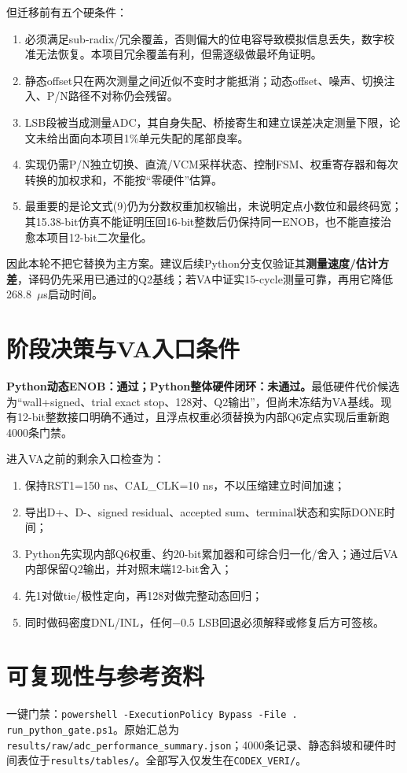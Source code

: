 \documentclass[UTF8,fontset=windows,a4paper,10.5pt]{ctexart}
\begin{document}
但迁移前有五个硬条件：
\begin{enumerate}
\item 必须满足sub-radix/冗余覆盖，否则偏大的位电容导致模拟信息丢失，数字校准无法恢复。本项目冗余覆盖有利，但需逐级做最坏角证明。
\item 静态offset只在两次测量之间近似不变时才能抵消；动态offset、噪声、切换注入、P/N路径不对称仍会残留。
\item LSB段被当成测量ADC，其自身失配、桥接寄生和建立误差决定测量下限，论文未给出面向本项目1\%单元失配的尾部良率。
\item 实现仍需P/N独立切换、直流/VCM采样状态、控制FSM、权重寄存器和每次转换的加权求和，不能按“零硬件”估算。
\item 最重要的是论文式(9)仍为分数权重加权输出，未说明定点小数位和最终码宽；其15.38-bit仿真不能证明压回16-bit整数后仍保持同一ENOB，也不能直接治愈本项目12-bit二次量化。
\end{enumerate}
因此本轮不把它替换为主方案。建议后续Python分支仅验证其\textbf{测量速度/估计方差}，译码仍先采用已通过的Q2基线；若VA中证实15-cycle测量可靠，再用它降低268.8~$\mu$s启动时间。

\section{阶段决策与VA入口条件}
\textbf{Python动态ENOB：通过；Python整体硬件闭环：未通过。}最低硬件代价候选为“wall+signed、trial exact stop、128对、Q2输出”，但尚未冻结为VA基线。现有12-bit整数接口明确不通过，且浮点权重必须替换为内部Q6定点实现后重新跑4000条门禁。

进入VA之前的剩余入口检查为：
\begin{enumerate}
\item 保持RST1=150 ns、CAL\_CLK=10 ns，不以压缩建立时间加速；
\item 导出D+、D-、signed residual、accepted sum、terminal状态和实际DONE时间；
\item Python先实现内部Q6权重、约20-bit累加器和可综合归一化/舍入；通过后VA内部保留Q2输出，并对照末端12-bit舍入；
\item 先1对做tie/极性定向，再128对做完整动态回归；
\item 同时做码密度DNL/INL，任何$-0.5$ LSB回退必须解释或修复后方可签核。
\end{enumerate}

\section{可复现性与参考资料}
一键门禁：\texttt{powershell -ExecutionPolicy Bypass -File .\\run\_python\_gate.ps1}。原始汇总为\texttt{results/raw/adc\_performance\_summary.json}；4000条记录、静态斜坡和硬件时间表位于\texttt{results/tables/}。全部写入仅发生在\texttt{CODEX\_VERI/}。
\end{document}
